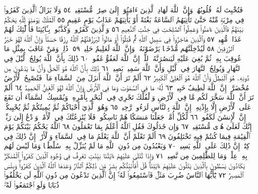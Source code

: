 فَتُخْبِتَ لَهُۥ قُلُوبُهُمْۗ وَإِنَّ ٱللَّهَ لَهَادِ ٱلَّذِينَ ءَامَنُوٓا۟ إِلَىٰ صِرَٰطࣲ
مُّسْتَقِيمࣲ ٥٤ وَلَا يَزَالُ ٱلَّذِينَ كَفَرُوا۟ فِي مِرْيَةࣲ مِّنْهُ حَتَّىٰ
تَأْتِيَهُمُ ٱلسَّاعَةُ بَغْتَةً أَوْ يَأْتِيَهُمْ عَذَابُ يَوْمٍ عَقِيمٍ ٥٥
ٱلْمُلْكُ يَوْمَئِذࣲ لِّلَّهِ يَحْكُمُ بَيْنَهُمْۚ فَٱلَّذِينَ ءَامَنُوا۟
وَعَمِلُوا۟ ٱلصَّٰلِحَٰتِ فِي جَنَّٰتِ ٱلنَّعِيمِ ٥٦ وَٱلَّذِينَ
كَفَرُوا۟ وَكَذَّبُوا۟ بِـَٔايَٰتِنَا فَأُو۟لَٰٓئِكَ لَهُمْ عَذَابࣱ
مُّهِينࣱ ٥٧ وَٱلَّذِينَ هَاجَرُوا۟ فِي سَبِيلِ ٱللَّهِ ثُمَّ قُتِلُوٓا۟
أَوْ مَاتُوا۟ لَيَرْزُقَنَّهُمُ ٱللَّهُ رِزْقًا حَسَنࣰاۚ وَإِنَّ ٱللَّهَ لَهُوَ
خَيْرُ ٱلرَّٰزِقِينَ ٥٨ لَيُدْخِلَنَّهُم مُّدْخَلࣰا يَرْضَوْنَهُۥۚ
وَإِنَّ ٱللَّهَ لَعَلِيمٌ حَلِيمࣱ ٥٩۞ ذَٰلِكَۖ وَمَنْ عَاقَبَ بِمِثْلِ
مَا عُوقِبَ بِهِۦ ثُمَّ بُغِيَ عَلَيْهِ لَيَنصُرَنَّهُ ٱللَّهُۚ إِنَّ ٱللَّهَ
لَعَفُوٌّ غَفُورࣱ ٦٠ ذَٰلِكَ بِأَنَّ ٱللَّهَ يُولِجُ ٱلَّيْلَ فِي
ٱلنَّهَارِ وَيُولِجُ ٱلنَّهَارَ فِي ٱلَّيْلِ وَأَنَّ ٱللَّهَ سَمِيعُۢ
بَصِيرࣱ ٦١ ذَٰلِكَ بِأَنَّ ٱللَّهَ هُوَ ٱلْحَقُّ وَأَنَّ مَا يَدْعُونَ
مِن دُونِهِۦ هُوَ ٱلْبَٰطِلُ وَأَنَّ ٱللَّهَ هُوَ ٱلْعَلِيُّ ٱلْكَبِيرُ ٦٢
أَلَمْ تَرَ أَنَّ ٱللَّهَ أَنزَلَ مِنَ ٱلسَّمَآءِ مَآءࣰ فَتُصْبِحُ ٱلْأَرْضُ
مُخْضَرَّةًۚ إِنَّ ٱللَّهَ لَطِيفٌ خَبِيرࣱ ٦٣ لَّهُۥ مَا فِي ٱلسَّمَٰوَٰتِ
وَمَا فِي ٱلْأَرْضِۚ وَإِنَّ ٱللَّهَ لَهُوَ ٱلْغَنِيُّ ٱلْحَمِيدُ ٦٤
أَلَمْ تَرَ أَنَّ ٱللَّهَ سَخَّرَ لَكُم مَّا فِي ٱلْأَرْضِ وَٱلْفُلْكَ تَجْرِي
فِي ٱلْبَحْرِ بِأَمْرِهِۦ وَيُمْسِكُ ٱلسَّمَآءَ أَن تَقَعَ عَلَى ٱلْأَرْضِ إِلَّا
بِإِذْنِهِۦٓۚ إِنَّ ٱللَّهَ بِٱلنَّاسِ لَرَءُوفࣱ رَّحِيمࣱ ٦٥ وَهُوَ ٱلَّذِيٓ
أَحْيَاكُمْ ثُمَّ يُمِيتُكُمْ ثُمَّ يُحْيِيكُمْۗ إِنَّ ٱلْإِنسَٰنَ لَكَفُورࣱ ٦٦
لِّكُلِّ أُمَّةࣲ جَعَلْنَا مَنسَكًا هُمْ نَاسِكُوهُۖ فَلَا يُنَٰزِعُنَّكَ
فِي ٱلْأَمْرِۚ وَٱدْعُ إِلَىٰ رَبِّكَۖ إِنَّكَ لَعَلَىٰ هُدࣰى مُّسْتَقِيمࣲ ٦٧
وَإِن جَٰدَلُوكَ فَقُلِ ٱللَّهُ أَعْلَمُ بِمَا تَعْمَلُونَ ٦٨ ٱللَّهُ يَحْكُمُ
بَيْنَكُمْ يَوْمَ ٱلْقِيَٰمَةِ فِيمَا كُنتُمْ فِيهِ تَخْتَلِفُونَ ٦٩
أَلَمْ تَعْلَمْ أَنَّ ٱللَّهَ يَعْلَمُ مَا فِي ٱلسَّمَآءِ وَٱلْأَرْضِۚ إِنَّ
ذَٰلِكَ فِي كِتَٰبٍۚ إِنَّ ذَٰلِكَ عَلَى ٱللَّهِ يَسِيرࣱ ٧٠ وَيَعْبُدُونَ
مِن دُونِ ٱللَّهِ مَا لَمْ يُنَزِّلْ بِهِۦ سُلْطَٰنࣰا وَمَا لَيْسَ لَهُم بِهِۦ
عِلْمࣱۗ وَمَا لِلظَّٰلِمِينَ مِن نَّصِيرࣲ ٧١ وَإِذَا تُتْلَىٰ عَلَيْهِمْ ءَايَٰتُنَا
بَيِّنَٰتࣲ تَعْرِفُ فِي وُجُوهِ ٱلَّذِينَ كَفَرُوا۟ ٱلْمُنكَرَۖ يَكَادُونَ
يَسْطُونَ بِٱلَّذِينَ يَتْلُونَ عَلَيْهِمْ ءَايَٰتِنَاۗ قُلْ أَفَأُنَبِّئُكُم بِشَرࣲّ مِّن
ذَٰلِكُمُۚ ٱلنَّارُ وَعَدَهَا ٱللَّهُ ٱلَّذِينَ كَفَرُوا۟ۖ وَبِئْسَ ٱلْمَصِيرُ ٧٢
يَٰٓأَيُّهَا ٱلنَّاسُ ضُرِبَ مَثَلࣱ فَٱسْتَمِعُوا۟ لَهُۥٓۚ إِنَّ ٱلَّذِينَ
تَدْعُونَ مِن دُونِ ٱللَّهِ لَن يَخْلُقُوا۟ ذُبَابࣰا وَلَوِ ٱجْتَمَعُوا۟ لَهُۥۖ
